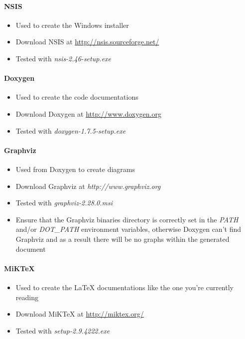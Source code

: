 \paragraph{\ac{NSIS}}
\begin{itemize}
\item{Used to create the Windows installer}
\item{Download \ac{NSIS} at \url{http://nsis.sourceforge.net/}}
\item{Tested with \emph{nsis-2.46-setup.exe}}
\end{itemize}


\paragraph{Doxygen}
\begin{itemize}
\item{Used to create the code documentations}
\item{Download Doxygen at \url{http://www.doxygen.org}}
\item{Tested with \emph{doxygen-1.7.5-setup.exe}}
\end{itemize}


\paragraph{Graphviz}
\begin{itemize}
\item{Used from Doxygen to create diagrams}
\item{Download Graphviz at \emph{http://www.graphviz.org}}
\item{Tested with \emph{graphviz-2.28.0.msi}}
\item{Ensure that the Graphviz binaries directory is correctly set in the \emph{PATH} and/or \emph{DOT\_PATH} environment variables, otherwise Doxygen can't find Graphviz and as a result there will be no graphs within the generated document}
\end{itemize}


\paragraph{MiKTeX}
\begin{itemize}
\item{Used to create the \LaTeX{} documentations like the one you're currently reading}
\item{Download MiKTeX at \url{http://miktex.org/}}
\item{Tested with \emph{setup-2.9.4222.exe}}
\end{itemize}


